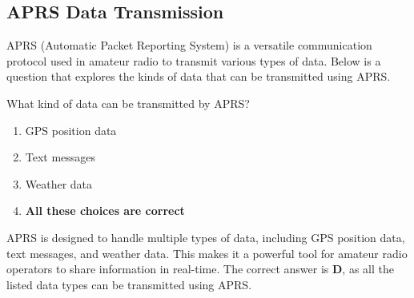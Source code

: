 \subsection{APRS Data Transmission}
\label{T8D03}

APRS (Automatic Packet Reporting System) is a versatile communication protocol used in amateur radio to transmit various types of data. Below is a question that explores the kinds of data that can be transmitted using APRS.

\begin{tcolorbox}[colback=gray!10!white,colframe=black!75!black,title=T8D03]
What kind of data can be transmitted by APRS?
\begin{enumerate}[noitemsep]
    \item GPS position data
    \item Text messages
    \item Weather data
    \item \textbf{All these choices are correct}
\end{enumerate}
\end{tcolorbox}

APRS is designed to handle multiple types of data, including GPS position data, text messages, and weather data. This makes it a powerful tool for amateur radio operators to share information in real-time. The correct answer is \textbf{D}, as all the listed data types can be transmitted using APRS.